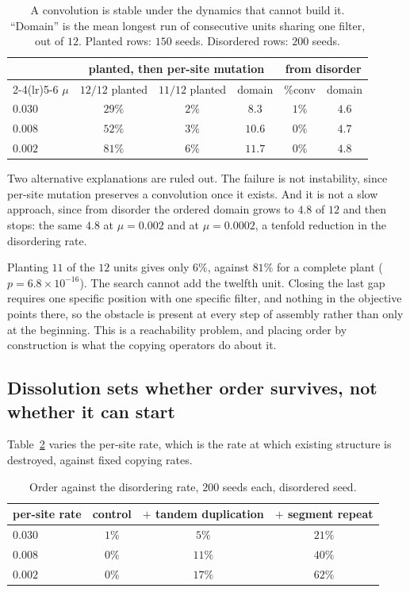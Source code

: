 \documentclass[11pt]{article}
\begin{document}
\begin{table}[t]
\centering\small
\begin{tabular}{@{}lccccc@{}}
\toprule
 & \multicolumn{3}{c}{planted, then per-site mutation} & \multicolumn{2}{c}{from disorder} \\
\cmidrule(lr){2-4}\cmidrule(lr){5-6}
$\mu$ & $12/12$ planted & $11/12$ planted & domain & \%conv & domain \\
\midrule
$0.030$ & $29\%$ & $2\%$ & $8.3$  & $1\%$ & $4.6$ \\
$0.008$ & $52\%$ & $3\%$ & $10.6$ & $0\%$ & $4.7$ \\
$0.002$ & $81\%$ & $6\%$ & $11.7$ & $0\%$ & $4.8$ \\
\bottomrule
\end{tabular}
\caption{A convolution is stable under the dynamics that cannot build it. ``Domain'' is the mean longest
run of consecutive units sharing one filter, out of $12$. Planted rows: $150$ seeds. Disordered rows:
$200$ seeds.}
\label{tab:stab}
\end{table}

Two alternative explanations are ruled out. The failure is not instability, since per-site mutation
preserves a convolution once it exists. And it is not a slow approach, since from disorder the ordered
domain grows to $4.8$ of $12$ and then stops: the same $4.8$ at $\mu = 0.002$ and at $\mu = 0.0002$,
a tenfold reduction in the disordering rate.

Planting $11$ of the $12$ units gives only $6\%$, against $81\%$ for a complete plant
($p = 6.8\times10^{-16}$). The search cannot add the twelfth unit. Closing the last gap requires one
specific position with one specific filter, and nothing in the objective points there, so the obstacle is
present at every step of assembly rather than only at the beginning. This is a reachability problem, and
placing order by construction is what the copying operators do about it.

\subsection{Dissolution sets whether order survives, not whether it can start}

Table~\ref{tab:ratio} varies the per-site rate, which is the rate at which existing structure is
destroyed, against fixed copying rates.

\begin{table}[t]
\centering\small
\begin{tabular}{@{}lccc@{}}
\toprule
per-site rate & control & $+$ tandem duplication & $+$ segment repeat \\
\midrule
$0.030$ & $1\%$ & $5\%$  & $21\%$ \\
$0.008$ & $0\%$ & $11\%$ & $40\%$ \\
$0.002$ & $0\%$ & $17\%$ & $62\%$ \\
\bottomrule
\end{tabular}
\caption{Order against the disordering rate, $200$ seeds each, disordered seed.}
\label{tab:ratio}
\end{table}
\end{document}
